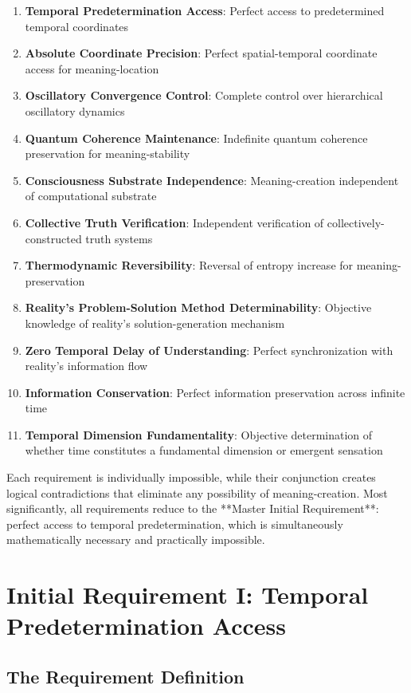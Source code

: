 \documentclass[12pt,a4paper]{article}
\begin{document}
\begin{enumerate}
\item \textbf{Temporal Predetermination Access}: Perfect access to predetermined temporal coordinates
\item \textbf{Absolute Coordinate Precision}: Perfect spatial-temporal coordinate access for meaning-location
\item \textbf{Oscillatory Convergence Control}: Complete control over hierarchical oscillatory dynamics
\item \textbf{Quantum Coherence Maintenance}: Indefinite quantum coherence preservation for meaning-stability
\item \textbf{Consciousness Substrate Independence}: Meaning-creation independent of computational substrate
\item \textbf{Collective Truth Verification}: Independent verification of collectively-constructed truth systems
\item \textbf{Thermodynamic Reversibility}: Reversal of entropy increase for meaning-preservation
\item \textbf{Reality's Problem-Solution Method Determinability}: Objective knowledge of reality's solution-generation mechanism
\item \textbf{Zero Temporal Delay of Understanding}: Perfect synchronization with reality's information flow
\item \textbf{Information Conservation}: Perfect information preservation across infinite time
\item \textbf{Temporal Dimension Fundamentality}: Objective determination of whether time constitutes a fundamental dimension or emergent sensation
\end{enumerate}

Each requirement is individually impossible, while their conjunction creates logical contradictions that eliminate any possibility of meaning-creation. Most significantly, all requirements reduce to the **Master Initial Requirement**: perfect access to temporal predetermination, which is simultaneously mathematically necessary and practically impossible.

\section{Initial Requirement I: Temporal Predetermination Access}

\subsection{The Requirement Definition}
\end{document}
